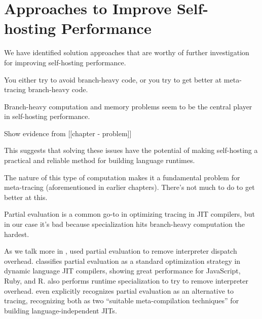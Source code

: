 \chapter{Approaches to Improve Self-hosting Performance}

	\label{chapter:solution}

    \begin{chaptersynopsis}
      We have identified solution approaches that are worthy of further investigation for improving self-hosting performance.

      You either try to avoid branch-heavy code, or you try to get better at meta-tracing branch-heavy code.
    \end{chaptersynopsis}

    \begin{paragraph-here}
      Branch-heavy computation and memory problems seem to be the central player in self-hosting performance.

      Show evidence from [[chapter - problem]]
    \end{paragraph-here}

    \begin{paragraph-here}
      This suggests that solving these issues have the potential of making self-hosting a practical and reliable method for building language runtimes.
    \end{paragraph-here}

    \begin{paragraph-here}
      The nature of this type of computation makes it a fundamental problem for meta-tracing (aforementioned in earlier chapters). There's not much to do to get better at this.
    \end{paragraph-here}

    \begin{paragraph-here}
      Partial evaluation is a common go-to in optimizing tracing in JIT compilers, but in our case it's bad because specialization hits branch-heavy computation the hardest.


      As we talk more in , \cite{truffle-graal} used partial evaluation to remove interpreter dispatch overhead.
    \cite{practical-partial} classifies partial evaluation as a standard optimization strategy in dynamic language JIT compilers, showing great performance for JavaScript, Ruby, and R.
    \cite{traceMonkey} also performs runtime specialization to try to remove interpreter overhead. \cite{trace-vs-PE} even explicitly recognizes partial evaluation as an alternative to tracing, recognizing both as  two “suitable meta-compilation techniques” for building language-independent JITs.
    \end{paragraph-here}


